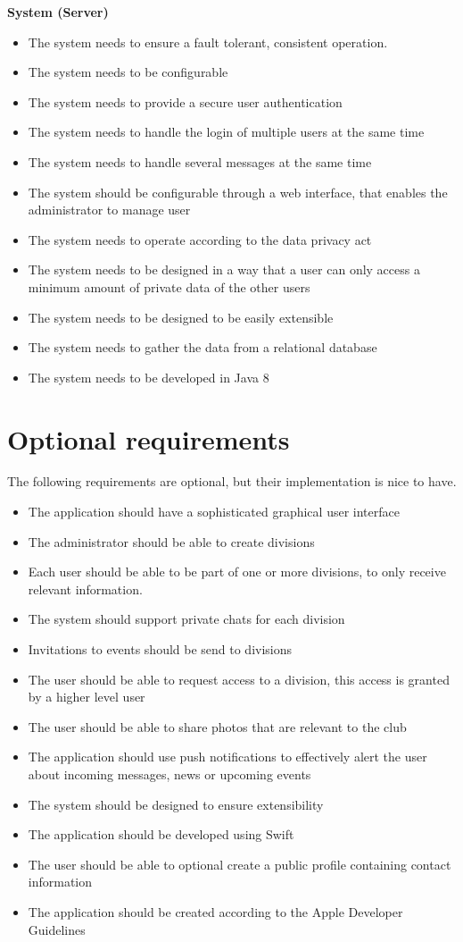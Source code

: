 \textbf{System (Server)}
\begin{itemize}
\item The system needs to ensure a fault tolerant, consistent operation.
\item The system needs to be configurable
\item The system needs to provide a secure user authentication
\item The system needs to handle the login of multiple users at the same time
\item The system needs to handle several messages at the same time
\item The system should be configurable through a web interface, that enables the administrator to manage user
\item The system needs to operate according to the data privacy act
\item The system needs to be designed in a way that a user can only access a minimum amount of private data of the other users
\item The system needs to be designed to be easily extensible
\item The system needs to gather the data from a relational database
\item The system needs to be developed in Java 8
\end{itemize}

\section{Optional requirements} %
The following requirements are optional, but their implementation is nice to have.
\begin{itemize}
\item The application should have a sophisticated graphical user interface
\item The administrator should be able to create divisions
\item Each user should be able to be part of one or more divisions, to only receive relevant information.
\item The system should support private chats for each division
\item Invitations to events should be send to divisions
\item The user should be able to request access to a division, this access is granted by a higher level user
\item The user should be able to share photos that are relevant to the club
\item The application should use push notifications to effectively alert the user about incoming messages, news or upcoming events
\item The system should be designed to ensure extensibility
\item The application should be developed using Swift
\item The user should be able to optional create a public profile containing contact information
\item The application should be created according to the Apple Developer Guidelines
\end{itemize}

